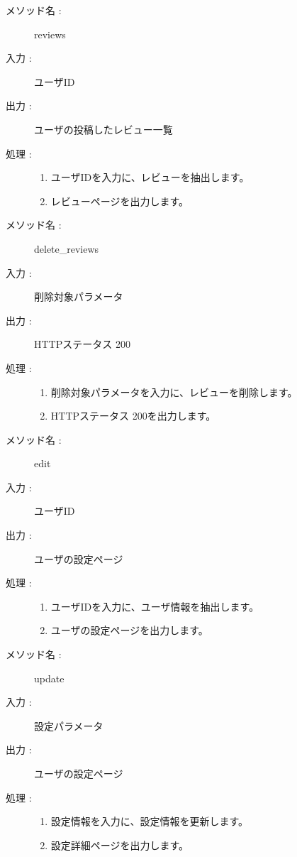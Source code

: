 \documentclass[a4j,titlepage]{jarticle}
\begin{document}
\begin{description}
\item [メソッド名 :] reviews
\item [入力 :] ユーザID
\item [出力 :] ユーザの投稿したレビュー一覧
\item [処理 :]\mbox{}
  \begin{enumerate}
  \item ユーザIDを入力に、レビューを抽出します。
  \item レビューページを出力します。
 \end{enumerate}
\end{description}

\begin{description}
\item [メソッド名 :] delete\_reviews
\item [入力 :] 削除対象パラメータ
\item [出力 :] HTTPステータス 200
\item [処理 :]\mbox{}
  \begin{enumerate}
    \item 削除対象パラメータを入力に、レビューを削除します。
    \item HTTPステータス 200を出力します。
 \end{enumerate}
\end{description}

\begin{description}
\item [メソッド名 :] edit
\item [入力 :] ユーザID
\item [出力 :] ユーザの設定ページ
\item [処理 :]\mbox{}
  \begin{enumerate}
  \item ユーザIDを入力に、ユーザ情報を抽出します。
  \item ユーザの設定ページを出力します。
 \end{enumerate}
\end{description}

\begin{description}
\item [メソッド名 :] update
\item [入力 :] 設定パラメータ
\item [出力 :] ユーザの設定ページ
\item [処理 :]\mbox{}
  \begin{enumerate}
  \item 設定情報を入力に、設定情報を更新します。
  \item 設定詳細ページを出力します。
  \end{enumerate}
\end{description}
\end{document}

